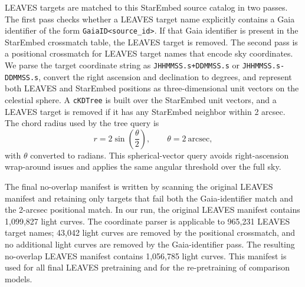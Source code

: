 LEAVES targets are matched to this StarEmbed source catalog in two passes.  The
first pass checks whether a LEAVES target name explicitly contains a Gaia
identifier of the form \texttt{GaiaID<source\_id>}.  If that Gaia identifier is
present in the StarEmbed crossmatch table, the LEAVES target is removed.  The
second pass is a positional crossmatch for LEAVES target names that encode sky
coordinates.  We parse the target coordinate string as
\texttt{JHHMMSS.s+DDMMSS.s} or \texttt{JHHMMSS.s-DDMMSS.s}, convert the right
ascension and declination to degrees, and represent both LEAVES and StarEmbed
positions as three-dimensional unit vectors on the celestial sphere.  A
\texttt{cKDTree} is built over the StarEmbed unit vectors, and a LEAVES target
is removed if it has any StarEmbed neighbor within 2 arcsec.  The chord radius
used by the tree query is
\[
    r = 2\sin\left(\frac{\theta}{2}\right),
    \qquad \theta = 2~\mathrm{arcsec},
\]
with $\theta$ converted to radians.  This spherical-vector query avoids
right-ascension wrap-around issues and applies the same angular threshold over
the full sky.

The final no-overlap manifest is written by scanning the original LEAVES
manifest and retaining only targets that fail both the Gaia-identifier match and
the 2-arcsec positional match.  In our run, the original LEAVES manifest
contains 1,099,827 light curves.  The coordinate parser is applicable to
965,231 LEAVES target names; 43,042 light curves are removed by the positional
crossmatch, and no additional light curves are removed by the Gaia-identifier
pass.  The resulting no-overlap LEAVES manifest contains 1,056,785 light
curves.  This manifest is used for all final LEAVES pretraining and for the
re-pretraining of comparison models.

